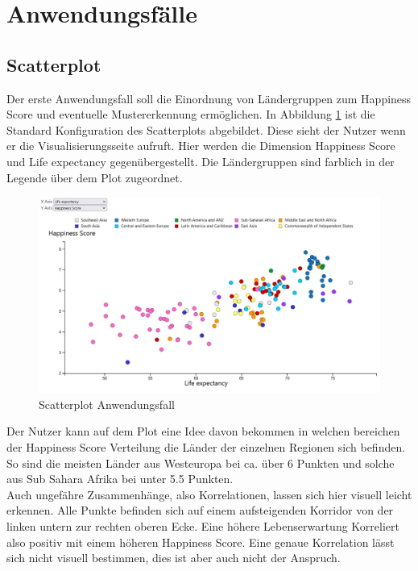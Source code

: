 \section{Anwendungsfälle}

\subsection{Scatterplot}

Der erste Anwendungsfall soll die Einordnung von Ländergruppen zum Happiness Score und eventuelle Mustererkennung ermöglichen. In Abbildung \ref{fig:scatterplot_anw} ist die Standard Konfiguration des Scatterplots abgebildet. Diese sieht der Nutzer wenn er die Visualisierungsseite aufruft. Hier werden die Dimension Happiness Score und Life expectancy gegenübergestellt. Die Ländergruppen sind farblich in der Legende über dem Plot zugeordnet.\\

\begin{figure}[h]
 \centering
 \includegraphics[width = \textwidth]{img/scatterplot_anw.jpg}
 \caption{Scatterplot Anwendungsfall}
 \label{fig:scatterplot_anw}
\end{figure}

Der Nutzer kann auf dem Plot eine Idee davon bekommen in welchen bereichen der Happiness Score Verteilung die Länder der einzelnen Regionen sich befinden. So sind die meisten Länder aus Westeuropa bei ca. über 6 Punkten und solche aus Sub Sahara Afrika bei unter 5.5 Punkten. \\

Auch ungefähre Zusammenhänge, also Korrelationen, lassen sich hier visuell leicht erkennen. Alle Punkte befinden sich auf einem aufsteigenden Korridor von der linken untern zur rechten oberen Ecke. Eine höhere Lebenserwartung Korreliert also positiv mit einem höheren Happiness Score. Eine genaue Korrelation lässt sich nicht visuell bestimmen, dies ist aber auch nicht der Anspruch. \\

